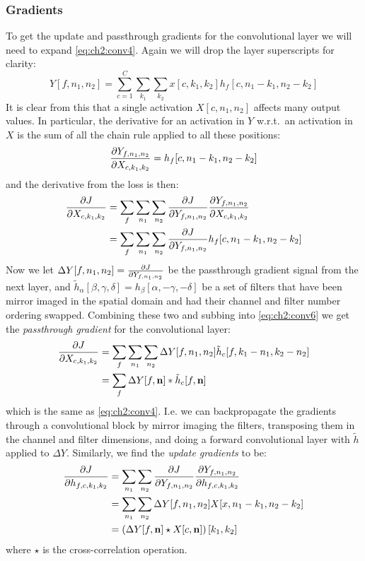 \subsubsection{Gradients}
To get the update and passthrough gradients for the convolutional layer we will need to expand
\eqref{eq:ch2:conv4}. Again we will drop the layer superscripts for clarity: 
\begin{equation}
  Y[f, n_1, n_2] = \sum_{c=1}^C \sum_{k_1} \sum_{k_2} x[c, k_1, k_2]
  h_f[c, n_1-k_1, n_2-k_2] \label{eq:ch2:conv5}
\end{equation}
It is clear from this that a single activation $X[c, n_1, n_2]$ affects
many output values. In particular, the derivative for an activation in $Y$
w.r.t.\ an activation in $X$ is the sum of all the chain rule applied to all
these positions:
\begin{equation}
  \frac{\partial Y_{f, n_1, n_2}}{\partial X_{c, k_1, k_2}} = h_f[c, n_1 - k_1, n_2 - k_2]
\end{equation}
and the derivative from the loss is then:
\begin{align}
  \frac{\partial J}{\partial X_{c,k_1,k_2}} &= \sum_f \sum_{n_1} \sum_{n_2} \frac{\partial J}{\partial Y_{f, n_1, n_2}}
  \frac{\partial Y_{f, n_1, n_2}}{\partial X_{c,k_1,k_2}} \\
  &= \sum_f \sum_{n_1} \sum_{n_2} \frac{\partial J}{\partial Y_{f, n_1, n_2}} h_f[c, n_1 - k_1, n_2 - k_2] \label{eq:ch2:conv6}
\end{align}
Now we let $\Delta Y[f, n_1, n_2] = \frac{\partial J}{\partial Y_{f, n_1, n_2}}$ be the passthrough gradient
signal from the next layer, and $\tilde{h}_\alpha[\beta, \gamma, \delta] = h_\beta[\alpha, -\gamma, -\delta]$
be a set of filters that have been mirror imaged in the spatial domain and had
their channel and filter number ordering swapped. Combining these two and
subbing into \eqref{eq:ch2:conv6} we get the \emph{passthrough gradient} for the
convolutional layer:
\begin{align}
  \frac{\partial J}{\partial X_{c,k_1,k_2}} &= \sum_f \sum_{n_1} \sum_{n_2} \Delta Y[f, n_1, n_2] \tilde{h}_c[f, k_1-n_1, k_2-n_2 ] \\
                          &= \sum_f \Delta Y[f, \mathbf{n}] \ast \tilde{h}_c[f, \mathbf{n}]
\end{align}
which is the same as \eqref{eq:ch2:conv4}. I.e. we can backpropagate the
gradients through a convolutional block by mirror imaging the filters,
transposing them in the channel and filter dimensions, and doing a forward
convolutional layer with $\tilde{h}$ applied to $\Delta Y$. Similarly, we 
find the \emph{update gradients} to be:
\begin{align}
  \frac{\partial J}{\partial h_{f,c,k_1,k_2}} &= \sum_{n_1} \sum_{n_2} \frac{\partial J}{\partial Y_{f, n_1, n_2}} \frac{\partial Y_{f, n_1, n_2}}{\partial h_{f, c, k_1, k_2}} \\
                            &= \sum_{n_1} \sum_{n_2} \Delta Y[f, n_1, n_2] X[x, n_1-k_1, n_2-k_2 ] \\
                            &= \left(\Delta Y[f, \mathbf{n}] \star X[c, \mathbf{n}]\right)[k_1, k_2]
\end{align}
where $\star$ is the cross-correlation operation. 


